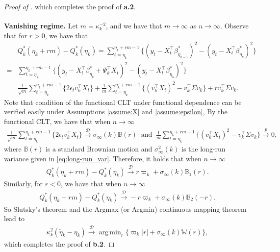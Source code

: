 \documentclass[11pt]{article}
\DeclareMathOperator*{\argmin}{arg\,min}
\theoremstyle{plain}
\theoremstyle{definition}
\begin{document}
\begin{proof}[Proof of ]
which completes the proof of \textbf{a.2}.
\\
\\
\textbf{Vanishing regime.}
Let $m = \kappa_k^{-2}$, and we have that $m \to \infty$ as $n \to \infty$. Observe that for $r > 0$, we have that
\begin{align*}
    &Q_k^*(\eta_k+ rm) - Q_k^*(\eta_k) = \sum_{t = \eta_k}^{\eta_k + rm - 1} \big\{(y_t - X_t^{\top}\beta_{\eta_{k-1}}^*)^2 - (y_t - X_t^{\top}\beta_{\eta_{k}}^*)^2\big\}\\
    =& \sum_{t = \eta_k}^{\eta_k + rm - 1}\big\{(y_t - X_t^{\top}\beta_{\eta_{k}}^* + \Psi_k^{\top}X_t)^2 - (y_t - X_t^{\top}\beta_{\eta_{k}}^*)^2\big\}\\
    =& \frac{1}{\sqrt{m}}\sum_{t = \eta_k}^{\eta_k + rm - 1}\big\{2\epsilon_tv_k^{\top}X_t\big\} +  \frac{1}{m}\sum_{t = \eta_k}^{\eta_k + rm - 1}\big\{(v_k^{\top}X_t)^2 - v_k^{\top}\Sigma v_k\big\} + rv_k^{\top}\Sigma v_k.
\end{align*}
Note that condition of the functional CLT under functional dependence \cite[Theorem 3 in][]{wu2011asymptotic} can be verified easily under Assumptions \ref{assume:X} and \ref{assume:epsilon}, By the functional CLT, we have that when $n \to \infty$
\begin{align*}
    \frac{1}{\sqrt{m}}\sum_{t = \eta_k}^{\eta_k + rm - 1}\big\{2\epsilon_tv_k^{\top}X_t\big\} \overset{\mathcal{D}}{\to}  \sigma_{\infty}(k)\mathbb{B}(r) \;\; \text{and} \;\; \frac{1}{m}\sum_{t = \eta_k}^{\eta_k + rm - 1}\big\{(v_k^{\top}X_t)^2 - v_k^{\top}\Sigma v_k\big\} \overset{p}{\to} 0,
\end{align*}
where $\mathbb{B}(r)$ is a standard Brownian motion and $\sigma^2_{\infty}(k)$ is the long-run variance given in \eqref{eq:long-run_var}.
Therefore, it holds that when $n \to \infty$
\begin{align*}
    Q_k^*(\eta_k+ rm) - Q_k^*(\eta_k) 
    \overset{\mathcal{D}}{\to} r\varpi_k + \sigma_{\infty}(k)\mathbb{B}_1(r).
\end{align*}
Similarly, for $r < 0$, we have that  when $n \to \infty$
\begin{align*}
    Q_k^*(\eta_k+ rm) - Q_k^*(\eta_k) 
    \overset{\mathcal{D}}{\to} -r\varpi_k + \sigma_{\infty}(k)\mathbb{B}_2(-r).
\end{align*}
So Slutsky's theorem and the Argmax (or Argmin) continuous mapping theorem \cite[see 3.2.2 Theorem][]{Vaart1996weak} lead to
    \begin{align*}
       \kappa_k^2(\widetilde{\eta}_k - \eta_k)
       \overset{\mathcal{D}}{\longrightarrow} \argmin_r \big\{\varpi_k|r| + \sigma_{\infty}(k)\mathbb{W}(r)\big\},
    \end{align*}
which completes the proof of \textbf{b.2}.
\end{proof}
\end{document}
